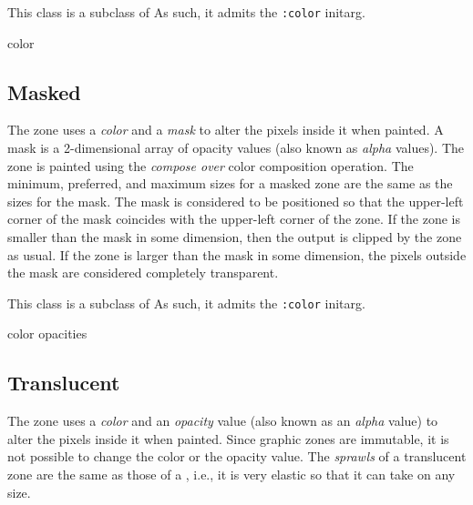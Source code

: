 
This class is a subclass of 
  As such, it admits the
\texttt{:color} initarg. 

 {color}

\subsection{Masked}
\label{sec-zones-graphic-masked}

The  zone uses a \emph{color} and a \emph{mask} to alter
the pixels inside it when painted.  A mask is a 2-dimensional array of
opacity values (also known as \emph{alpha} values).  The zone is
painted using the \emph{compose over} color composition operation.
The minimum, preferred, and maximum sizes for a masked zone are the
same as the sizes for the mask.  The mask is considered to be
positioned so that the upper-left corner of the mask coincides with
the upper-left corner of the zone.  If the zone is smaller than the
mask in some dimension, then the output is clipped by the zone as
usual.  If the zone is larger than the mask in some dimension, the
pixels outside the mask are considered completely transparent. 



This class is a subclass of 
  As such, it admits the
\texttt{:color} initarg. 


 {color opacities}

\subsection{Translucent}
\label{sec-zones-graphic-translucent}

The  zone uses a \emph{color} and an \emph{opacity}
value (also known as an \emph{alpha} value) to alter the pixels inside
it when painted.  Since graphic zones are immutable, it is not
possible to change the color or the opacity value.  The \emph{sprawls}
of a translucent zone are the same as those of a 
, i.e., it is very elastic so that it
can take on any size.



